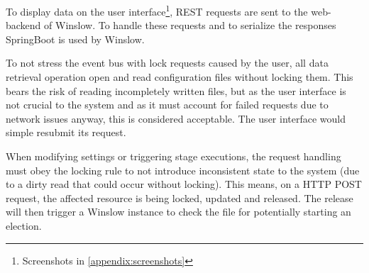 To display data on the user interface\footnote{Screenshots in \autoref{appendix:screenshots}}, REST requests are sent to the web-backend of Winslow.
To handle these requests and to serialize the responses SpringBoot\cite{springboot} is used by Winslow.

To not stress the event bus with lock requests caused by the user, all data retrieval operation open and read configuration files without locking them.
This bears the risk of reading incompletely written files, but as the user interface is not crucial to the system and as it must account for failed requests due to network issues anyway, this is considered acceptable.
The user interface would simple resubmit its request.

When modifying settings or triggering stage executions, the request handling must obey the locking rule to not introduce inconsistent state to the system (due to a dirty read\cite[2]{berenson1995a} that could occur without locking).
This means, on a HTTP POST request, the affected resource is being locked, updated and released.
The release will then trigger a Winslow instance to check the file for potentially starting an election.






